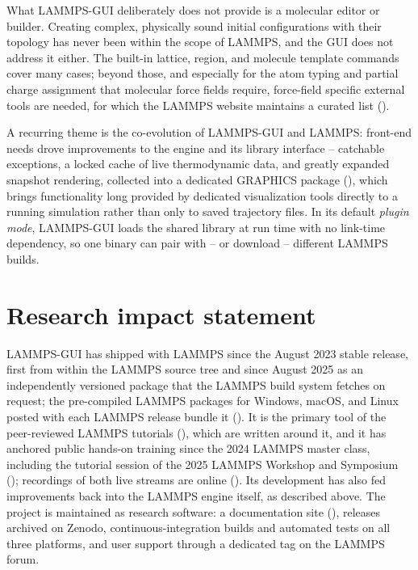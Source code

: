 \documentclass[
]{article}
\begin{document}
What LAMMPS-GUI deliberately does not provide is a molecular editor or
builder. Creating complex, physically sound initial configurations with
their topology has never been within the scope of LAMMPS, and the GUI
does not address it either. The built-in lattice, region, and molecule
template commands cover many cases; beyond those, and especially for the
atom typing and partial charge assignment that molecular force fields
require, force-field specific external tools are needed, for which the
LAMMPS website maintains a curated list
().

A recurring theme is the co-evolution of LAMMPS-GUI and LAMMPS:
front-end needs drove improvements to the engine and its library
interface -- catchable exceptions, a locked cache of live thermodynamic
data, and greatly expanded snapshot rendering, collected into a
dedicated GRAPHICS package (), which brings functionality long provided by dedicated
visualization tools directly to a running simulation rather than only to
saved trajectory files. In its default \emph{plugin mode}, LAMMPS-GUI
loads the shared library at run time with no link-time dependency, so
one binary can pair with -- or download -- different LAMMPS builds.

\section{Research impact statement}\label{research-impact-statement}

LAMMPS-GUI has shipped with LAMMPS since the August 2023 stable release,
first from within the LAMMPS source tree and since August 2025 as an
independently versioned package that the LAMMPS build system fetches on
request; the pre-compiled LAMMPS packages for Windows, macOS, and Linux
posted with each LAMMPS release bundle it
(). It is the
primary tool of the peer-reviewed LAMMPS tutorials
(), which are
written around it, and it has anchored public hands-on training since
the 2024 LAMMPS master class, including the tutorial session of the 2025
LAMMPS Workshop and Symposium (); recordings of both live streams are online
(). Its
development has also fed improvements back into the LAMMPS engine
itself, as described above. The project is maintained as research
software: a documentation site (), releases archived on Zenodo, continuous-integration builds and
automated tests on all three platforms, and user support through a
dedicated tag on the LAMMPS forum.
\end{document}
